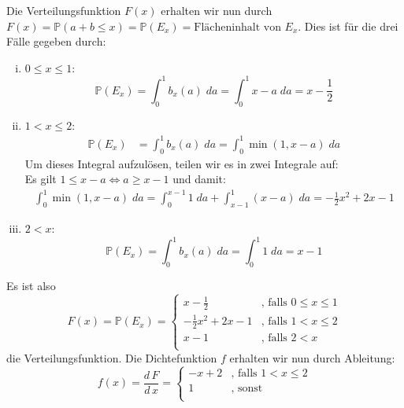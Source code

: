 \documentclass[11pt,a4paper,ngerman]{article}
\newcommand{\Prob}{\mathbb{P}}
\begin{document}
Die Verteilungsfunktion $F(x)$ erhalten wir nun durch\\
$F(x) = \Prob(a+b \leq x) = \Prob(E_x) = \text{Flächeninhalt von $E_x$}$.
Dies ist für die drei Fälle gegeben durch:
\begin{enumerate}[(i)]
\item $0 \leq x \leq 1$: 
\begin{equation*}
 \Prob(E_x) = \int_0^1 b_x(a) \; da =  \int_0^1 x-a \; da = x - \frac{1}{2}
\end{equation*}
\item $1 < x \leq 2$: 
\begin{equation*}\begin{split}
 \Prob(E_x) &= \int_0^1 b_x(a) \; da =  \int_0^1 \min(1, x - a) \; da
\end{split}\end{equation*}
Um dieses Integral aufzulösen, teilen wir es in zwei Integrale auf: \\
Es gilt $1 \leq x-a \Leftrightarrow a \geq x-1$ und damit:
\begin{equation*}\begin{split}
\int_0^1 \min(1, x - a) \; da = \int_0^{x-1} 1 \; da + \int_{x-1}^1 (x-a) \; da = -\frac{1}{2}x^2 +2x-1
\end{split}\end{equation*}
\item $2 < x$: 
\begin{equation*}
 \Prob(E_x) = \int_0^1 b_x(a) \; da =  \int_0^1 1 \; da = x-1
\end{equation*}
\end{enumerate}

Es ist also
\begin{equation*}
F(x) = \Prob(E_x) = \begin{cases}
                          x - \frac{1}{2} & \text{, falls $0 \leq x \leq 1$} \\
                          -\frac{1}{2}x^2 +2x-1 & \text{, falls $1 < x \leq 2$} \\
                          x - 1 & \text{, falls $2 < x$} \\
                     \end{cases}
\end{equation*}
die Verteilungsfunktion.
Die Dichtefunktion $f$ erhalten wir nun durch Ableitung:
\begin{equation*}
f(x) = \frac{d\, F}{d \, x} = \begin{cases}
                          -x +2 & \text{, falls $1 < x \leq 2$} \\
                          1 & \text{, sonst} \\
                     \end{cases}
\end{equation*}
\end{document}
